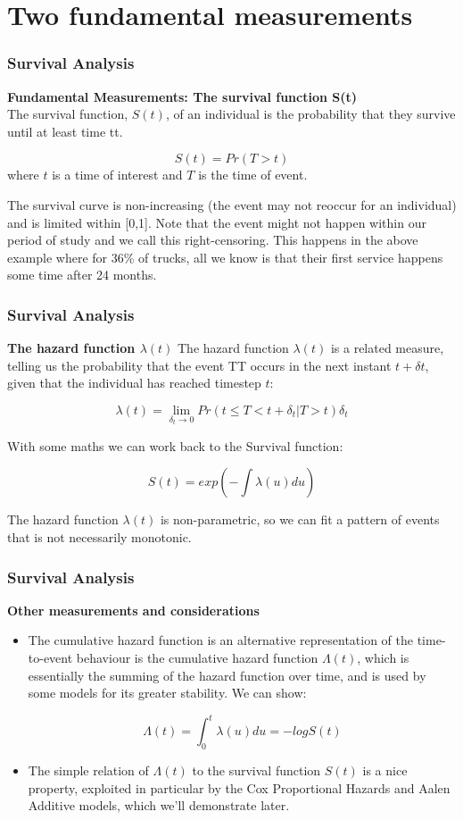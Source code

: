 \documentclass[]{beamer}
\begin{document}
	\section{Two fundamental measurements}
	\begin{frame}
		\frametitle{Survival Analysis}
		\noindent \textbf{Fundamental Measurements: The survival function S(t)} \\
		
		The survival function, $S(t)$, of an individual is the probability that they survive until at least time tt.
		
		\[S(t)=Pr(T>t)\]
		where $t$ is a time of interest and $T$ is the time of event.
		
		The survival curve is non-increasing (the event may not reoccur for an individual) and is limited within [0,1]. Note that the event might not happen within our period of study and we call this right-censoring. This happens in the above example where for 36\% of trucks, all we know is that their first service happens some time after 24 months.
	\end{frame}
	\begin{frame}
		\frametitle{Survival Analysis}
		\noindent \textbf{The hazard function $\lambda(t)$} %
		The hazard function $\lambda(t)$ is a related measure, telling us the probability that the event TT occurs in the next instant $t+ \delta t$, given that the individual has reached timestep $t$:
		
		\[\lambda(t)=\lim _{\delta_t \rightarrow 0} Pr(t \leq T<t+\delta_t | T>t) \delta_t\]
		
		With some maths we can work back to the Survival function:
		
		\[S(t)=exp(−\int \lambda(u)du)\]
		
		The hazard function $\lambda(t)$ is non-parametric, so we can fit a pattern of events that is not necessarily monotonic.
		
	\end{frame}
	\begin{frame}
		\frametitle{Survival Analysis}
		
		\noindent \textbf{Other measurements and considerations}\\
		
		\begin{itemize}
			\item The cumulative hazard function is an alternative representation of the time-to-event behaviour is the cumulative hazard function $\Lambda(t)$, which is essentially the summing of the hazard function over time, and is used by some models for its greater stability. We can show:
			
			\[ \Lambda(t)=\int_0^t \lambda(u)du = - logS(t)\]
			
			\item The simple relation of $\Lambda(t)$ to the survival function $S(t)$ is a nice property, exploited in particular by the Cox Proportional Hazards and Aalen Additive models, which we'll demonstrate later.
		\end{itemize}
		
	\end{frame}
\end{document}
